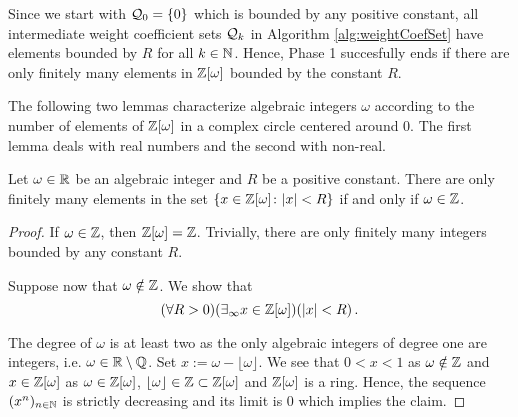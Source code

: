 Since we start with $\mathcal{Q}_0=\{0\}$ which is bounded by any positive constant, all intermediate weight coefficient sets $\mathcal{Q}_k$ in Algorithm \ref{alg:weightCoefSet} have elements bounded by $R$ for all $k\in\mathbb{N}$. Hence, Phase 1 succesfully ends if there are only finitely many elements in $\mathbb{Z}[\omega]$ bounded by the constant $R$. 


The following two lemmas characterize algebraic integers $\omega$ according to the number of elements of $\mathbb{Z}[\omega]$ in a complex circle centered around 0. The first lemma deals with real numbers and the second with non-real.
\begin{lem}
\label{lem:numElemRR}
Let $\omega\in\mathbb{R}$ be an algebraic integer and $R$ be a positive constant. There are only finitely many elements in the set $\left\{x \in\mathbb{Z}[\omega] \colon |x|<R \right\}$ if and only if $\omega \in \mathbb{Z}$. 
\end{lem}
\begin{proof}
If $\omega \in \mathbb{Z}$, then $\mathbb{Z}[\omega] = \mathbb{Z}$. Trivially, there are only finitely many integers bounded by any constant $R$.

Suppose now that $\omega \notin \mathbb{Z}$. We show that 
$$
(\forall R>0) (\exists_\infty x\in \mathbb{Z}[\omega])(|x|<R)\,.
$$ 

The degree of $\omega$ is at least two as the only algebraic integers of degree one are integers, i.e. $\omega \in \mathbb{R} \setminus \mathbb{Q}$. 
Set $x:= \omega- \lfloor \omega \rfloor$. We see that $0<x<1$ as $\omega \notin \mathbb{Z}$ and $x \in \mathbb{Z}[\omega]$ as $\omega \in \mathbb{Z}[\omega]$, $\lfloor \omega \rfloor \in  \mathbb{Z}\subset\mathbb{Z}[\omega]$ and $\mathbb{Z}[\omega]$ is a ring. 
Hence, the sequence $(x^n)_{n\in \mathbb{N}}$ is strictly decreasing and its limit is 0 which implies the claim.
\end{proof}


